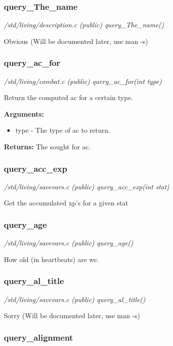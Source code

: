 \subsubsection{query\_The\_name}

{\em /std/living/description.c (public) query\_The\_name()}

Obvious (Will be documented later, use man -s)


\subsubsection{query\_ac\_for}

{\em /std/living/combat.c (public) query\_ac\_for(int type)}

Return the computed ac for a certain type.

{\bf Arguments:}
\begin{itemize}
\item     type - The type of ac to return.
\end{itemize}

{\bf Returns:}        The sought for ac.


\subsubsection{query\_acc\_exp}

{\em /std/living/savevars.c (public) query\_acc\_exp(int stat)}

Get the accumulated xp's for a given stat


\subsubsection{query\_age}

{\em /std/living/savevars.c (public) query\_age()}

How old (in heartbeats) are we.


\subsubsection{query\_al\_title}

{\em /std/living/savevars.c (public) query\_al\_title()}

Sorry (Will be documented later, use man -s)


\subsubsection{query\_alignment}

